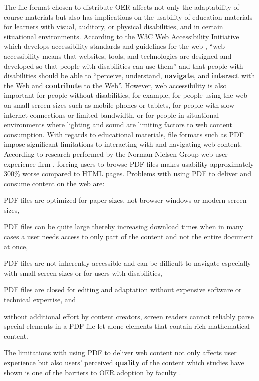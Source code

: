 \documentclass[11pt]{article}
\begin{document}
The file format chosen to distribute OER affects not only the adaptability of course materials but also has implications on the usability of education materials for learners with visual, auditory, or physical disabilities, and in certain situational environments.  According to the W3C Web Accessibility Initiative which develops accessibility standards and guidelines for the web \cite{w3cwai}, ``web accessibility means that websites, tools, and technologies are designed and developed so that people with disabilities can use them'' and that people with disabilities should be able to ``perceive, understand, \textbf{navigate}, and \textbf{interact} with the Web and \textbf{contribute} to the Web''.  However, web accessibility is also important for people without disabilities, for example, for people using the web on small screen sizes such as mobile phones or tablets, for people with slow internet connections or limited bandwidth, or for people in situational environments where lighting and sound are limiting factors to web content consumption.  With regards to educational materials, file formats such as PDF impose significant limitations to interacting with and navigating web content.  According to research performed by the Norman Nielsen Group  web user-experience firm \cite{JN-AK:20}, forcing users to browse PDF files makes usability approximately 300\% worse compared to HTML pages.  Problems with using PDF to deliver and consume content on the web are:
\begin{compactitem}
\item PDF files are optimized for paper sizes, not browser windows or modern screen sizes, 
\item PDF files can be quite large thereby increasing download times when in many cases a user  needs access to only part of the content and not the entire document at once,
\item PDF files are not inherently accessible and can be difficult to navigate especially with small screen sizes or for users with disabilities,
\item PDF files are closed for editing and adaptation without expensive software or technical expertise, and
\item without additional effort by content creators, screen readers cannot reliably parse special elements in a PDF file let alone elements that contain rich mathematical content.
\end{compactitem}
The limitations with using PDF to deliver web content not only affects user experience but also users' perceived \textbf{quality} of the content which studies have shown is one of the barriers to OER adoption by faculty \cite{OB-RB:16, RJ-RP-CH:2016, JS-JS:2018}.
\end{document}
